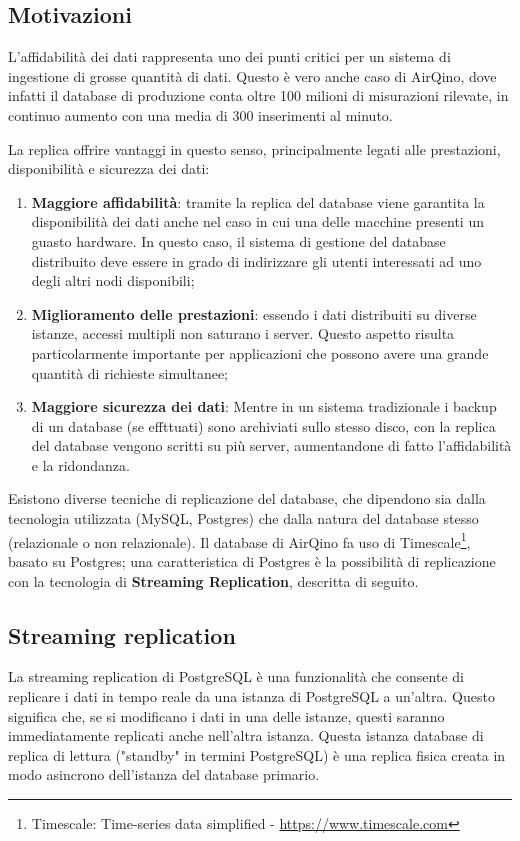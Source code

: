 \subsection{Motivazioni}\label{ssec:replica-motivazioni}
L'affidabilità dei dati rappresenta uno dei punti critici per un sistema di ingestione di grosse quantità di dati. Questo è vero anche caso di AirQino, dove infatti il database di produzione conta oltre 100 milioni di misurazioni rilevate, in continuo aumento con una media di 300 inserimenti al minuto.

La replica offrire vantaggi in questo senso, principalmente legati alle prestazioni, disponibilità e sicurezza dei dati:
\begin{enumerate}
  \item \textbf{Maggiore affidabilità}: tramite la replica del database viene garantita la disponibilità dei dati anche nel caso in cui una delle macchine presenti un guasto hardware. In questo caso, il sistema di gestione del database distribuito deve essere in grado di indirizzare gli utenti interessati ad uno degli altri nodi disponibili;
  \item \textbf{Miglioramento delle prestazioni}: essendo i dati distribuiti su diverse istanze, accessi multipli non saturano i server. Questo aspetto risulta particolarmente importante per applicazioni che possono avere una grande quantità di richieste simultanee;
  \item \textbf{Maggiore sicurezza dei dati}: Mentre in un sistema tradizionale i backup di un database (se effttuati) sono archiviati sullo stesso disco, con la replica del database vengono scritti su più server, aumentandone di fatto l'affidabilità e la ridondanza.
\end{enumerate}

Esistono diverse tecniche di replicazione del database, che dipendono sia dalla tecnologia utilizzata (MySQL, Postgres) che dalla natura del database stesso (relazionale o non relazionale). Il database di AirQino fa uso di Timescale\footnote{Timescale: Time-series data simplified - \url{https://www.timescale.com}}, basato su Postgres; una caratteristica di Postgres è la possibilità di replicazione con la tecnologia di \textbf{Streaming Replication}, descritta di seguito.

\subsection{Streaming replication}\label{ssec:streaming-replication}
La streaming replication di PostgreSQL è una funzionalità che consente di replicare i dati in tempo reale da una istanza di PostgreSQL a un'altra. Questo significa che, se si modificano i dati in una delle istanze, questi saranno immediatamente replicati anche nell'altra istanza. Questa istanza database di replica di lettura ("standby" in termini PostgreSQL) è una replica fisica creata in modo asincrono dell'istanza del database primario.

